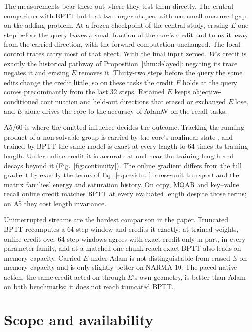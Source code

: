 \documentclass[11pt]{article}
\theoremstyle{definition}
\begin{document}
The measurements bear these out where they test them directly. The central
comparison with BPTT holds at two larger shapes, with one small measured gap on the
adding problem. At a frozen
checkpoint of the central study, erasing $E$ one step before the query leaves a
small fraction of the core's credit and turns it away from the carried direction,
with the forward computation unchanged. The local-control traces carry most of that
effect. With the final input zeroed, $W$'s credit is exactly the historical
pathway of Proposition~\ref{thm:delayed}: negating its trace negates it and erasing
$E$ removes it. Thirty-two steps before the query the same edits change the credit
little, so on these tasks the credit $E$ holds at the query comes predominantly from
the last 32 steps. Retained $E$ keeps objective-conditioned continuation and
held-out directions that erased or exchanged $E$ lose, and $E$ alone drives the core
to the accuracy of AdamW on the recall tasks.

A5/60 is where the omitted influence decides the outcome. Tracking the running
product of a non-solvable group is carried by the core's nonlinear state
\citep{rosdahl2026dabsn}, and trained by BPTT the same model is exact at every
length to 64 times its training length. Under online credit it is accurate at and
near the training length and decays beyond it (Fig.~\ref{fig:continuity}). The
online gradient differs from the full gradient by exactly the terms of
Eq.~\eqref{eq:residual}: cross-unit transport and the matrix families' energy and
saturation history. On copy, MQAR and key--value recall online credit matches BPTT
at every evaluated length despite those terms; on A5 they cost length invariance.

Uninterrupted streams are the hardest comparison in the paper. Truncated BPTT
recomputes a 64-step window and credits it exactly; at trained weights, online credit
over 64-step windows agrees with exact credit only in part, in every parameter
family, and at a matched one-chunk reach exact BPTT also leads on memory capacity.
Carried $E$ under Adam is not distinguishable from erased $E$ on memory capacity and
is only slightly better on NARMA-10. The paced native action, the same credit acted
on through $E$'s own geometry, is better than Adam on both benchmarks; it does not
reach truncated BPTT.

\section{Scope and availability}
\end{document}
